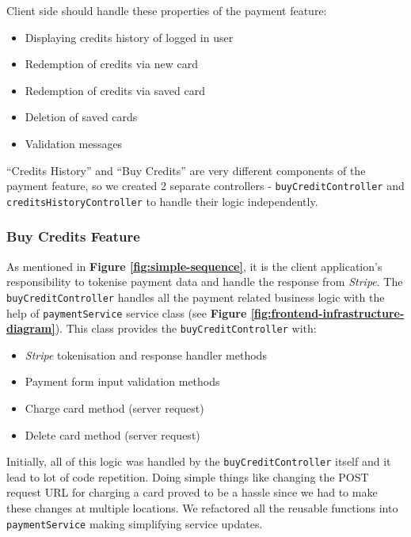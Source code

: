 Client side should handle these properties of the payment feature:

\begin{itemize}
\item Displaying credits history of logged in user
\item Redemption of credits via new card
\item Redemption of credits via saved card
\item Deletion of saved cards
\item Validation messages
\end{itemize}

“Credits History” and “Buy Credits” are very different components of the payment feature, so we created 2 separate controllers - \texttt{buyCreditController} and \texttt{creditsHistoryController} to handle their logic independently.

\subsubsection{Buy Credits Feature}
\label{subsubsec:buy-credits-feature}

As mentioned in \textbf{Figure \ref{fig:simple-sequence}}, it is the client application's responsibility to tokenise payment data and handle the response from \textit{Stripe}. The \texttt{buyCreditController} handles all the payment related business logic with the help of \texttt{paymentService} service class (see \textbf{Figure \ref{fig:frontend-infrastructure-diagram}}). This class provides the \texttt{buyCreditController} with:

\begin{itemize}
\item \textit{Stripe} tokenisation and response handler methods
\item Payment form input validation methods
\item Charge card method (server request)
\item Delete card method (server request)
\end{itemize}

Initially, all of this logic was handled by the \texttt{buyCreditController} itself and it lead to lot of code repetition. Doing simple things like changing the POST request URL for charging a card proved to be a hassle since we had to make these changes at multiple locations. We refactored all the reusable functions into \texttt{paymentService} making simplifying service updates. \\


